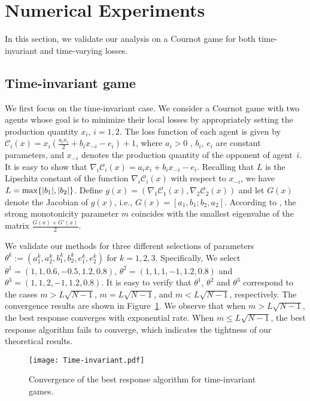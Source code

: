\section{Numerical Experiments}\label{sec:simulation}
In this section, we validate our analysis on a Cournot game for both time-invariant and time-varying losses.
\subsection{Time-invariant game}
We first focus on the time-invariant case.
We consider a Cournot game with two agents whose goal is to minimize their local losses by appropriately setting the production quantity $x_i$, $i=1,2$.
The loss function of each agent is given by $\mathcal{C}_i(x) = x_i(\frac{a_i x_i}{2} + b_i x_{-i} - e_i)+ 1$, where $a_i>0$ , $b_i$, $e_i$ are constant parameters, and $x_{-i}$ denotes the production quantity of the opponent of agent~$i$. 
It is easy to show that $\nabla_i \mathcal{C}_i(x) = a_i x_i + b_i x_{-i} -e_i$. Recalling that $L$ is the Lipschitz constant of the function $\nabla_i \mathcal{C}_i(x)$ with respect to $x_{-i}$, we have $L={\rm{max}}\{ |b_1|,|b_2|\}$.
%
Define $g(x) = (\nabla_1 \mathcal{C}_1(x), \nabla_2 \mathcal{C}_2(x))$ and let $G(x)$ denote the Jacobian of $g(x)$, i.e., $G(x)=[a_1,b_1;b_2,a_2]$. 
According to \cite{rosen1965existence}, the strong monotonicity parameter $m$  coincides with the smallest eigenvalue of the matrix $\frac{G(x)+G'(x)}{2}$. 

We validate our methods for three different selections of parameters $\theta^k:=(a_1^k,a_2^k,b_1^k,b_2^k,e_1^k,e_2^k)$ for $k=1,2,3$. Specifically, We select $\theta^1 = (1,1,0.6,-0.5,1.2,0.8)$, $\theta^2 = (1,1,1,-1,1.2,0.8)$ and $\theta^3 = (1,1,2,-1,1.2,0.8)$. It is easy to verify that $\theta^1$, $\theta^2$ and $\theta^3$ correspond to the cases $m>L\sqrt{N-1}$, $m=L\sqrt{N-1}$, and $m<L\sqrt{N-1}$, respectively. The convergence results are shown in Figure~\ref{fig_TI}. We observe that when $m>L\sqrt{N-1}$, the best response converges with exponential rate. When $m\leq L\sqrt{N-1}$, the best response algorithm fails to converge, which indicates the tightness of our theoretical results.

\begin{figure}[t] 
\begin{center}
\centerline{\texttt{[image: Time-invariant.pdf]}}
\caption{Convergence of the best response algorithm for time-invariant games.}
\label{fig_TI}
\end{center}
\vskip -0.2in
\end{figure}



